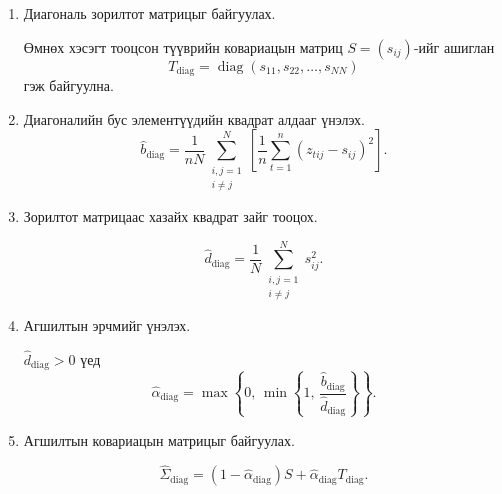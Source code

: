 \begin{enumerate}
\item Диагональ зорилтот матрицыг байгуулах.

Өмнөх хэсэгт тооцсон түүврийн ковариацын
матриц $S=(s_{ij})$-ийг ашиглан
\[
T_{\mathrm{diag}}
=
\operatorname{diag}
(s_{11},s_{22},\ldots,s_{NN})
\]
гэж байгуулна.
	\item Диагоналийн бус элементүүдийн
	квадрат алдааг үнэлэх.
	\[
	\widehat b_{\mathrm{diag}}
	=
	\frac{1}{nN}
	\sum_{\substack{i,j=1\\i\neq j}}^{N}
	\left[
	\frac{1}{n}
	\sum_{t=1}^{n}
	(z_{tij}-s_{ij})^2
	\right].
	\]
	\item Зорилтот матрицаас хазайх
	квадрат зайг тооцох.
	
	\[
	\widehat d_{\mathrm{diag}}
	=
	\frac{1}{N}
	\sum_{\substack{i,j=1\\i\neq j}}^{N}
	s_{ij}^{2}.
	\]
	
	\item Агшилтын эрчмийг үнэлэх.
	
	$\widehat d_{\mathrm{diag}}>0$ үед
	\[
	\widehat{\alpha}_{\mathrm{diag}}
	=
	\max\left\{
	0,\,
	\min\left\{
	1,\,
	\frac{\widehat b_{\mathrm{diag}}}
	{\widehat d_{\mathrm{diag}}}
	\right\}
	\right\}.
	\]
	
	\item Агшилтын ковариацын
	матрицыг байгуулах.
	
	\[
		\widehat{\Sigma}_{\mathrm{diag}}
		=
		(1-\widehat{\alpha}_{\mathrm{diag}})S
		+
		\widehat{\alpha}_{\mathrm{diag}}
		T_{\mathrm{diag}}.
	\]
\end{enumerate}
